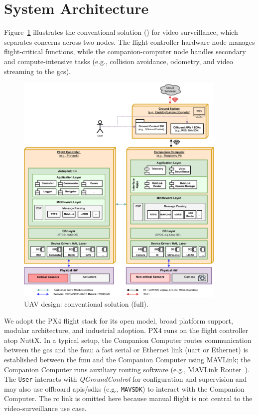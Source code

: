 \section{System Architecture}
\label{sec:design-sysArch}

Figure~\ref{fig:uav-design-conv-sol-1} illustrates the conventional solution
() for video surveillance, which separates concerns across two
nodes. The flight-controller hardware node manages flight-critical functions,
while the companion-computer node handles secondary and compute-intensive tasks
(e.g., collision avoidance, odometry, and video streaming to the \gls{gcs}).

\begin{figure}[!hbt]
  \centering
  \includegraphics[width=0.9\textwidth]{./img/pdf/uav-main-design-conv-sol-1.pdf}
  \caption{UAV design: conventional solution (full).}
  \label{fig:uav-design-conv-sol-1}
\end{figure}

We adopt the PX4 flight stack for its open model, broad platform support,
modular architecture, and industrial adoption. PX4 runs on the flight controller
atop NuttX. In a typical setup, the Companion Computer routes communication
between the \gls{gcs} and the \gls{fmu}: a fast serial or Ethernet link
(\gls{uart} or Ethernet) is established between the \gls{fmu} and the Companion
Computer using MAVLink; the Companion Computer runs auxiliary routing software
(e.g., MAVLink Router~\cite{px4-routers}). The \lstinline|User| interacts with
\emph{QGroundControl} for configuration and supervision and may also use
offboard \glspl{api}/\glspl{sdk} (e.g., \lstinline|MAVSDK|) to interact with the
Companion Computer. The \gls{rc} link is omitted here because manual flight is
not central to the video-surveillance use case.

